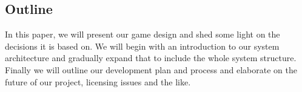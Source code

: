 \subsection{Outline}
In this paper, we will present our game design and shed some light on the decisions 
it is based on. We will begin with an introduction to our system architecture and 
gradually expand that to include the whole system structure.\\
Finally we will outline our development plan and process and elaborate on the 
future of our project, licensing issues and the like.
%
